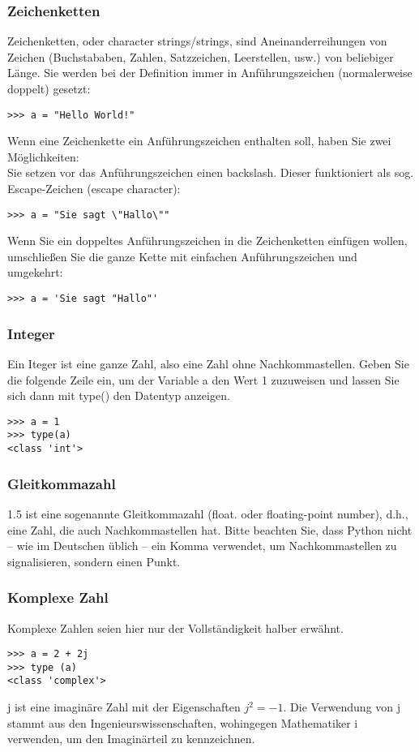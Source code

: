 \documentclass{article}
\begin{document}
\subsubsection{Zeichenketten}
Zeichenketten, oder character strings/strings, sind Aneinanderreihungen von Zeichen (Buchstababen, Zahlen, Satzzeichen, Leerstellen, usw.) von beliebiger Länge. Sie werden bei der Definition immer in Anführungszeichen (normalerweise doppelt) gesetzt:\\
\begin{verbatim}
>>> a = "Hello World!"
\end{verbatim}
Wenn eine Zeichenkette ein Anführungszeichen enthalten soll, haben Sie zwei Möglichkeiten:\\
Sie setzen vor das Anführungszeichen einen backslash. Dieser funktioniert als sog. Escape-Zeichen (escape character):\\
\begin{verbatim}
>>> a = "Sie sagt \"Hallo\""
\end{verbatim}
Wenn Sie ein doppeltes Anführungszeichen in die Zeichenketten einfügen wollen, umschließen Sie die ganze Kette mit einfachen Anführungszeichen und umgekehrt:\\
\begin{verbatim}
>>> a = 'Sie sagt "Hallo"'
\end{verbatim}

\newpage

\subsubsection{Integer}
Ein Iteger ist eine ganze Zahl, also eine Zahl ohne Nachkommastellen. Geben Sie die folgende Zeile ein, um der Variable a den Wert 1 zuzuweisen und lassen Sie sich dann mit type() den Datentyp anzeigen.\\
\begin{verbatim}
>>> a = 1
>>> type(a)
<class 'int'>
\end{verbatim}
\subsubsection{Gleitkommazahl}
1.5 ist eine sogenannte Gleitkommazahl (float. oder floating-point number), d.h., eine Zahl, die auch Nachkommastellen hat. Bitte beachten Sie, dass Python nicht -- wie im Deutschen üblich -- ein Komma verwendet, um Nachkommastellen zu signalisieren, sondern einen Punkt.\\
\subsubsection{Komplexe Zahl}
Komplexe Zahlen seien hier nur der Vollständigkeit halber erwähnt.\\
\begin{verbatim}
>>> a = 2 + 2j
>>> type (a)
<class 'complex'>
\end{verbatim}
j ist eine imaginäre Zahl mit der Eigenschaften $j^2=-1$. Die Verwendung von j stammt aus den Ingenieurswissenschaften, wohingegen Mathematiker i verwenden, um den Imaginärteil zu kennzeichnen.\\
\end{document}

